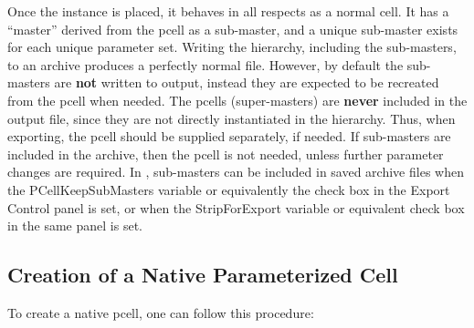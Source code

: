 Once the instance is placed, it behaves in all respects as a normal
cell.  It has a ``master'' derived from the pcell as a sub-master, and
a unique sub-master exists for each unique parameter set.  Writing the
hierarchy, including the sub-masters, to an archive produces a
perfectly normal file.  However, by default the sub-masters are {\bf
not} written to output, instead they are expected to be recreated from
the pcell when needed.  The pcells (super-masters) are {\bf never}
included in the output file, since they are not directly instantiated
in the hierarchy.  Thus, when exporting, the pcell should be supplied
separately, if needed.  If sub-masters are included in the archive,
then the pcell is not needed, unless further parameter changes are
required.  In {\Xic}, sub-masters can be included in saved archive
files when the {\et PCellKeepSubMasters} variable or equivalently the
check box in the {\cb Export Control} panel is set, or when the
{\et StripForExport} variable or equivalent check box in the same
panel is set.

\subsection{Creation of a Native Parameterized Cell}

To create a native pcell, one can follow this procedure:

